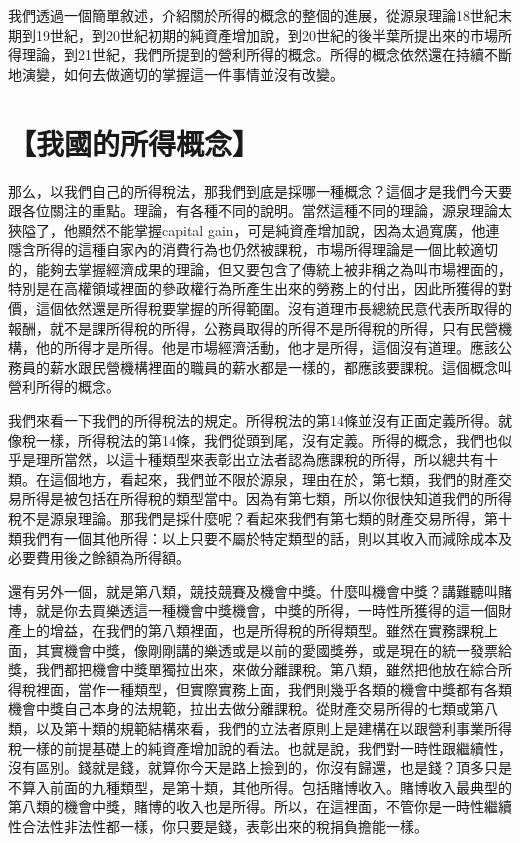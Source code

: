 \documentclass[]{ctexbook}
\begin{document}
我們透過一個簡單敘述，介紹關於所得的概念的整個的進展，從源泉理論18世紀末期到19世紀，到20世紀初期的純資產增加說，到20世紀的後半葉所提出來的市場所得理論，到21世紀，我們所提到的營利所得的概念。所得的概念依然還在持續不斷地演變，如何去做適切的掌握這一件事情並沒有改變。

\hypertarget{ux6211ux570bux7684ux6240ux5f97ux6982ux5ff5}{%
\section{【我國的所得概念】}\label{ux6211ux570bux7684ux6240ux5f97ux6982ux5ff5}}

那么，以我們自己的所得稅法，那我們到底是採哪一種概念？這個才是我們今天要跟各位關注的重點。理論，有各種不同的說明。當然這種不同的理論，源泉理論太狹隘了，他顯然不能掌握capital gain，可是純資產增加說，因為太過寬廣，他連隱含所得的這種自家內的消費行為也仍然被課稅，市場所得理論是一個比較適切的，能夠去掌握經濟成果的理論，但又要包含了傳統上被非稱之為叫市場裡面的，特別是在高權領域裡面的參政權行為所產生出來的勞務上的付出，因此所獲得的對價，這個依然還是所得稅要掌握的所得範圍。沒有道理市長總統民意代表所取得的報酬，就不是課所得稅的所得，公務員取得的所得不是所得稅的所得，只有民營機構，他的所得才是所得。他是市場經濟活動，他才是所得，這個沒有道理。應該公務員的薪水跟民營機構裡面的職員的薪水都是一樣的，都應該要課稅。這個概念叫營利所得的概念。

我們來看一下我們的所得稅法的規定。所得稅法的第14條並沒有正面定義所得。就像稅一樣，所得稅法的第14條，我們從頭到尾，沒有定義。所得的概念，我們也似乎是理所當然，以這十種類型來表彰出立法者認為應課稅的所得，所以總共有十類。在這個地方，看起來，我們並不限於源泉，理由在於，第七類，我們的財產交易所得是被包括在所得稅的類型當中。因為有第七類，所以你很快知道我們的所得稅不是源泉理論。那我們是採什麼呢？看起來我們有第七類的財產交易所得，第十類我們有一個其他所得：以上只要不屬於特定類型的話，則以其收入而減除成本及必要費用後之餘額為所得額。

還有另外一個，就是第八類，競技競賽及機會中獎。什麼叫機會中獎？講難聽叫賭博，就是你去買樂透這一種機會中獎機會，中獎的所得，一時性所獲得的這一個財產上的增益，在我們的第八類裡面，也是所得稅的所得類型。雖然在實務課稅上面，其實機會中獎，像剛剛講的樂透或是以前的愛國獎券，或是現在的統一發票給獎，我們都把機會中獎單獨拉出來，來做分離課稅。第八類，雖然把他放在綜合所得稅裡面，當作一種類型，但實際實務上面，我們則幾乎各類的機會中獎都有各類機會中獎自己本身的法規範，拉出去做分離課稅。從財產交易所得的七類或第八類，以及第十類的規範結構來看，我們的立法者原則上是建構在以跟營利事業所得稅一樣的前提基礎上的純資產增加說的看法。也就是說，我們對一時性跟繼續性，沒有區別。錢就是錢，就算你今天是路上撿到的，你沒有歸還，也是錢？頂多只是不算入前面的九種類型，是第十類，其他所得。包括賭博收入。賭博收入最典型的第八類的機會中獎，賭博的收入也是所得。所以，在這裡面，不管你是一時性繼續性合法性非法性都一樣，你只要是錢，表彰出來的稅捐負擔能一樣。
\end{document}
